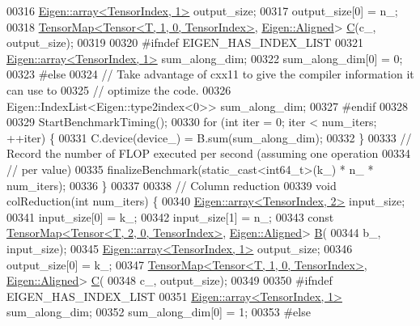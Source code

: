 \begin{DoxyCode}
00316     \hyperlink{class_eigen_1_1array}{Eigen::array<TensorIndex, 1>} output\_size;
00317     output\_size[0] = n\_;
00318     \hyperlink{class_eigen_1_1_tensor_map}{TensorMap<Tensor<T, 1, 0, TensorIndex>}, 
      \hyperlink{group__enums_gga45fe06e29902b7a2773de05ba27b47a1ad37d4c71425bb286e9b4103830538fbf}{Eigen::Aligned}> \hyperlink{group___core___module}{C}(c\_, output\_size);
00319 
00320 \textcolor{preprocessor}{#ifndef EIGEN\_HAS\_INDEX\_LIST}
00321     \hyperlink{class_eigen_1_1array}{Eigen::array<TensorIndex, 1>} sum\_along\_dim;
00322     sum\_along\_dim[0] = 0;
00323 \textcolor{preprocessor}{#else}
00324     \textcolor{comment}{// Take advantage of cxx11 to give the compiler information it can use to}
00325     \textcolor{comment}{// optimize the code.}
00326     Eigen::IndexList<Eigen::type2index<0>> sum\_along\_dim;
00327 \textcolor{preprocessor}{#endif}
00328 
00329     StartBenchmarkTiming();
00330     \textcolor{keywordflow}{for} (\textcolor{keywordtype}{int} iter = 0; iter < num\_iters; ++iter) \{
00331       C.device(device\_) = B.sum(sum\_along\_dim);
00332     \}
00333     \textcolor{comment}{// Record the number of FLOP executed per second (assuming one operation}
00334     \textcolor{comment}{// per value)}
00335     finalizeBenchmark(static\_cast<int64\_t>(k\_) * n\_ * num\_iters);
00336   \}
00337 
00338   \textcolor{comment}{// Column reduction}
00339   \textcolor{keywordtype}{void} colReduction(\textcolor{keywordtype}{int} num\_iters) \{
00340     \hyperlink{class_eigen_1_1array}{Eigen::array<TensorIndex, 2>} input\_size;
00341     input\_size[0] = k\_;
00342     input\_size[1] = n\_;
00343     \textcolor{keyword}{const} \hyperlink{class_eigen_1_1_tensor_map}{TensorMap<Tensor<T, 2, 0, TensorIndex>}, 
      \hyperlink{group__enums_gga45fe06e29902b7a2773de05ba27b47a1ad37d4c71425bb286e9b4103830538fbf}{Eigen::Aligned}> \hyperlink{group___core___module_class_eigen_1_1_matrix}{B}(
00344         b\_, input\_size);
00345     \hyperlink{class_eigen_1_1array}{Eigen::array<TensorIndex, 1>} output\_size;
00346     output\_size[0] = k\_;
00347     \hyperlink{class_eigen_1_1_tensor_map}{TensorMap<Tensor<T, 1, 0, TensorIndex>}, 
      \hyperlink{group__enums_gga45fe06e29902b7a2773de05ba27b47a1ad37d4c71425bb286e9b4103830538fbf}{Eigen::Aligned}> \hyperlink{group___core___module}{C}(
00348         c\_, output\_size);
00349 
00350 \textcolor{preprocessor}{#ifndef EIGEN\_HAS\_INDEX\_LIST}
00351     \hyperlink{class_eigen_1_1array}{Eigen::array<TensorIndex, 1>} sum\_along\_dim;
00352     sum\_along\_dim[0] = 1;
00353 \textcolor{preprocessor}{#else}

\end{DoxyCode}
